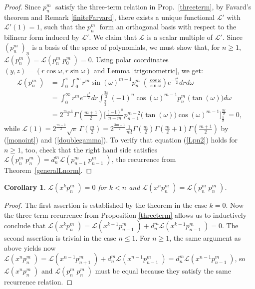\documentclass{amsart}
\newcommand{\p}[2]{p_{#1}^{#2}\;\!\!}
\renewcommand{\L}{\mathcal{L}}
\theoremstyle{plain}
\newtheorem{corollary}[theorem]{Corollary}
\theoremstyle{definition}
\theoremstyle{remark}
\begin{document}
\begin{proof}
Since $\p{n}{m}$ satisfy the three-term relation in Prop.~\ref{threeterm}, by Favard's theorem and Remark \ref{finiteFarvard}, there exists a unique functional $\L'$ with $\L'(1)=1$, such that the $\p{n}{m}$ form an orthogonal basis with respect to the bilinear form induced by $\L'$. We claim that $\L$ is a scalar multiple of $\L'$.
Since $(\p{n}{m})_{n} $ is a basis of the space of polynomials, we must show that, for $n\geq 1$, $\L(\p{n}{m}) = \L(\p{n}{m}\p{0}{m}) =0$.
Using polar coordinates $(y,z) = (r\cos\omega,r\sin\omega)$ and Lemma \ref{trigonometric}, we get:
\begin{align*}
\L(\p{n}{m}) &= \int_0^\pi\!\!\int_0^\infty r^m\sin(\omega)^{m-1} \p{n}{m}\left(\tfrac{\cos\omega}{\sin\omega}\right)e^{-\frac{r^2}{2}}dr d\omega \\
&=\int_0^\infty r^m e^{-\frac{r^2}{2}}dr \int_{\frac{\pi}{2}}^{\frac{3\pi}{2}} (-1)^n \cos(\omega)^{m-1}\p{n}{m}\big(\tan(\omega)\big)d\omega\\
&= 2^{\frac{m-1}{2}}\Gamma\left(\tfrac{m+1}{2}\right)\Big[\tfrac{(-1)^n}{n-m}p_{n-1}^{m-2}\big(\tan(\omega)\big)\cos(\omega)^{m-1} \Big]_{\frac{\pi}{2}}^{\frac{3\pi}{2}} =0,
\end{align*}
while $\L(1) = 2^{\frac{m-1}{2}}\sqrt{\pi}\,\Gamma\!\left(\frac{m}{2}\right)=2^{\frac{3m-1}{2}}  \frac{1}{m!}
\Gamma\left(\frac{m}{2}\right)\Gamma\left(\frac{m}{2}+1\right)\Gamma\left(\frac{m+1}{2}\right)$ by (\ref{monoint}) and (\ref{doublegamma}). To verify that equation (\ref{Lpn2}) holds for $n\geq 1$, too, check that the right hand side satisfies $\L(\p{n}{m}\p{n}{m}) = d_n^m\L(\p{n-1}{m}\p{n-1}{m})$, the recurrence from Theorem~\ref{generalLnorm}.
\end{proof}
\begin{corollary} \label{pcor}
 $\L(x^{k}\p{n}{m}) = 0$ for $k < n$ and $\L(x^n\p{n}{m})= \L(\p{n}{m}\p{n}{m})$.
\end{corollary}
\begin{proof}
The first assertion is established by the theorem in the case $k=0$. Now the three-term recurrence from Proposition \ref{threeterm} allows us to inductively conclude that $\L(x^k\p{n}{m}) = \L(x^{k-1}\p{n+1}{m})+d_n^m\L(x^{k-1}\p{n-1}{m}) =0$. The second assertion is trivial in the case $n\leq 1$. For $n\geq 1$, the same argument as above yields now $\L(x^n\p{n}{m}) = \L(x^{n-1}\p{n+1}{m})+d_n^m\L(x^{n-1}\p{n-1}{m})=d_n^m\L(x^{n-1}\p{n-1}{m})$, so $\L(x^n\p{n}{m})$ and $\L(\p{n}{m}\p{n}{m})$ must be equal because they satisfy the same recurrence relation.
\end{proof}
\end{document}
